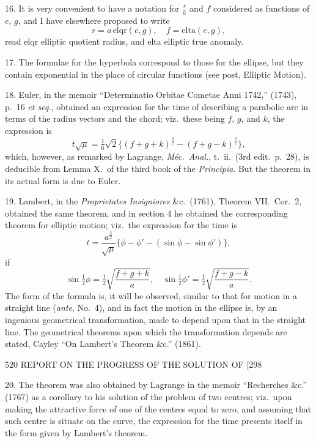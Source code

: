 \documentclass[11pt]{article}
\begin{document}
16. It is very convenient to have a notation for $\frac{r}{a}$ and $f$ considered as functions of $e$, $g$, and I have elsewhere proposed to write
\[ r = a\,\mathrm{elqr}(e,g),\quad f = \mathrm{elta}(e,g), \]
read elqr elliptic quotient radius, and elta elliptic true anomaly.

17. The formulae for the hyperbola correspond to those for the ellipse, but they contain exponential in the place of circular functions (see post, Elliptic Motion).

18. Euler, in the memoir ``Determinatio Orbitae Cometae Anni 1742,'' (1743), p.\ 16 \emph{et seq.}, obtained an expression for the time of describing a parabolic arc in terms of the radius vectors and the chord; viz.\ these being $f$, $g$, and $k$, the expression is
\[ t\sqrt{\mu} = \tfrac{1}{6}\sqrt{2}\{(f+g+k)^{\frac{3}{2}}-(f+g-k)^{\frac{3}{2}}\}, \]
which, however, as remarked by Lagrange, \emph{M\'ec.\ Anal.}, t.\ ii.\ (3rd edit.\ p.\ 28), is deducible from Lemma X.\ of the third book of the \emph{Principia}. But the theorem in its actual form is due to Euler.

19. Lambert, in the \emph{Proprietates Insigniores} \&c.\ (1761), Theorem VII.\ Cor.\ 2, obtained the same theorem, and in section 4 he obtained the corresponding theorem for elliptic motion; viz.\ the expression for the time is
\[ t = \frac{a^{\frac{3}{2}}}{\sqrt{\mu}}\{\phi-\phi'-(\sin\phi-\sin\phi')\}, \]
if
\[ \sin\tfrac{1}{2}\phi = \tfrac{1}{2}\sqrt{\frac{f+g+k}{a}},\quad \sin\tfrac{1}{2}\phi' = \tfrac{1}{2}\sqrt{\frac{f+g-k}{a}}. \]
The form of the formula is, it will be observed, similar to that for motion in a straight line (\emph{ante}, No.\ 4), and in fact the motion in the ellipse is, by an ingenious geometrical transformation, made to depend upon that in the straight line. The geometrical theorems upon which the transformation depends are stated, Cayley ``On Lambert's Theorem \&c.'' (1861).

\newpage
\begin{center}
520 \hfill REPORT ON THE PROGRESS OF THE SOLUTION OF \hfill [298
\end{center}

20. The theorem was also obtained by Lagrange in the memoir ``Recherches \&c.'' (1767) as a corollary to his solution of the problem of two centres; viz.\ upon making the attractive force of one of the centres equal to zero, and assuming that such centre is situate on the curve, the expression for the time presents itself in the form given by Lambert's theorem.
\end{document}
